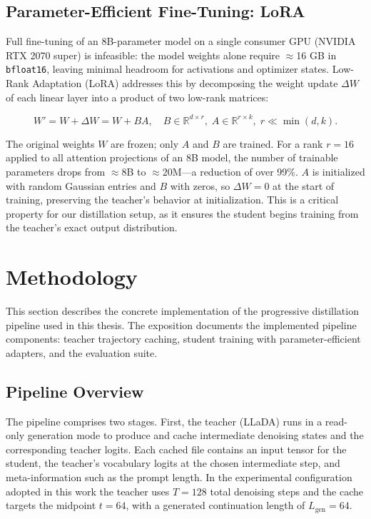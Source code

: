 \documentclass[11pt, a4paper]{article}
\begin{document}
\subsection{Parameter-Efficient Fine-Tuning: LoRA}
\label{subsec:lora}

Full fine-tuning of an 8B-parameter model on a single consumer GPU (NVIDIA RTX 2070 super) is infeasible: the model
weights alone require $\approx$16 GB in \texttt{bfloat16}, leaving minimal headroom for
activations and optimizer states. Low-Rank Adaptation (LoRA) \cite{hu2022lora} addresses
this by decomposing the weight update $\Delta W$ of each linear layer into a product of
two low-rank matrices:

\begin{equation}
    W' = W + \Delta W = W + BA, \quad B \in \mathbb{R}^{d \times r},\;
    A \in \mathbb{R}^{r \times k},\; r \ll \min(d, k).
    \label{eq:lora}
\end{equation}

\noindent The original weights $W$ are frozen; only $A$ and $B$ are trained. For a rank
$r = 16$ applied to all attention projections of an 8B model, the number of trainable
parameters drops from $\approx$8B to $\approx$20M---a reduction of over 99\%. $A$ is
initialized with random Gaussian entries and $B$ with zeros, so $\Delta W = 0$ at the
start of training, preserving the teacher's behavior at initialization. This is a critical
property for our distillation setup, as it ensures the student begins training from the
teacher's exact output distribution.

\section{Methodology}
\label{sec:methodology}

This section describes the concrete implementation of the progressive distillation
pipeline used in this thesis. The exposition documents the implemented pipeline
components: teacher trajectory caching, student training with parameter-efficient
adapters, and the evaluation suite.

\subsection{Pipeline Overview}

The pipeline comprises two stages. First, the teacher (LLaDA) runs in a read-only
generation mode to produce and cache intermediate denoising states and the
corresponding teacher logits. Each cached file contains an input tensor for the
student, the teacher's vocabulary logits at the chosen intermediate step, and
meta-information such as the prompt length. In the experimental configuration
adopted in this work the teacher uses $T=128$ total denoising steps and the cache
targets the midpoint $t=64$, with a generated continuation length of $L_{\text{gen}}=64$.
\end{document}
